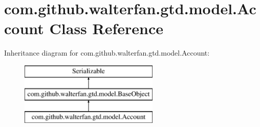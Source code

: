 \hypertarget{classcom_1_1github_1_1walterfan_1_1gtd_1_1model_1_1Account}{\section{com.\-github.\-walterfan.\-gtd.\-model.\-Account Class Reference}
\label{classcom_1_1github_1_1walterfan_1_1gtd_1_1model_1_1Account}
}
Inheritance diagram for com.\-github.\-walterfan.\-gtd.\-model.\-Account\-:\begin{figure}[H]
\begin{center}
\leavevmode
\includegraphics[height=3.000000cm]{classcom_1_1github_1_1walterfan_1_1gtd_1_1model_1_1Account}
\end{center}
\end{figure}
